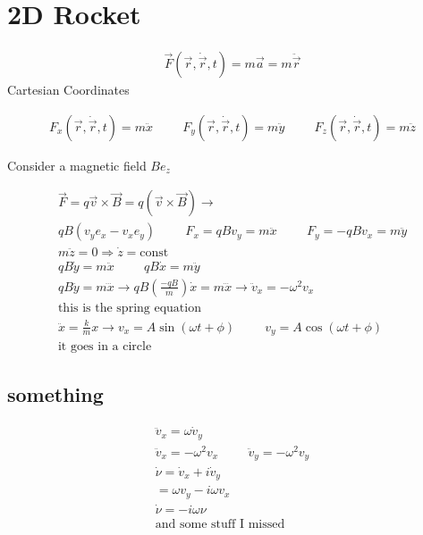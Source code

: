 \documentclass[fleqn]{report}
\newcommand{\hp}{\hspace{1cm}}
\newcommand{\equations} [1] {
\begin{gather*}
#1
\end{gather*}
}
\begin{document}
\section{2D Rocket}
\begin{gather*}
    \vec F(\vec r, \dot \vec r, t) = m \vec a = m \ddot \vec r
\end{gather*}
Cartesian Coordinates 
\equations{
    F_x(\vec r, \dot \vec r, t) = m \ddot x
    \hp
    F_y(\vec r, \dot \vec r, t) = m \ddot y
    \hp
    F_z(\vec r, \dot \vec r, t) = m \ddot z
}
Consider a magnetic field $B e_z$
\equations{
    \vec F = q \vec v \times \vec B = q(\vec v \times \vec B)
    \rightarrow
    \\
    qB(v_y e_x - v_x e_y)
    \hp 
    F_x = qBv_y = m \ddot x
    \hp 
    F_y = -qB v_x = m \ddot y 
    \\
    m \ddot z = 0 \Longrightarrow \dot z = \textrm{const}
    \\
    qB \dot y = m \ddot x
    \hp 
    qB \dot x = m \ddot y
    \\
    qB \ddot y = m \dddot x
    \rightarrow
    qB (\frac{-qB}{m}) \dot x = m \dddot x
    \rightarrow
    \ddot v_x = - \omega^2 v_x
    \\
    \textrm{this is the spring equation}
    \\
    \ddot x = \frac{k}{m} x
    \longrightarrow
    v_x = A \sin(\omega t + \phi)
    \hp 
    v_y = A \cos(\omega t + \phi)
    \\
    \textrm{it goes in a circle}
}

\subsection{something}
\equations{
    \ddot v_x = \omega \dot v_y
    \\
    \ddot v_x = -\omega^2 v_x
    \hp 
    \ddot v_y = - \omega^2 v_y
    \\
    \dot \nu = \dot v_x + i \dot v_y
    \\
    =
    \omega v_y - i \omega v_x
    \\
    \dot \nu = -i \omega \nu 
    \\
    \textrm{and some stuff I missed}
}
\end{document}
